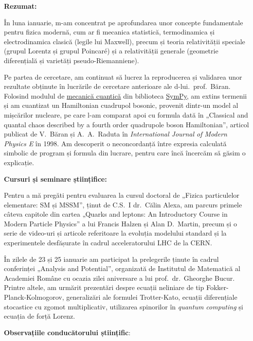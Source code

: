 
\makereportpreamble

\textbf{Rezumat:}

În luna ianuarie, m-am concentrat pe aprofundarea unor concepte fundamentale pentru fizica modernă, cum ar fi mecanica statistică, termodinamica și electrodinamica clasică (legile lui Maxwell), precum și teoria relativității speciale (grupul Lorentz și grupul Poincaré) și a relativității generale (geometrie diferențială și varietăți pseudo-Riemanniene).

Pe partea de cercetare, am continuat să lucrez la reproducerea și validarea unor rezultate obținute în lucrările de cercetare anterioare ale d-lui.~prof.~Băran. Folosind modulul de \href{https://docs.sympy.org/latest/modules/physics/quantum/index.html}{mecanică cuantică} din biblioteca \href{https://www.sympy.org/en/index.html}{SymPy}, am extins termenii și am cuantizat un Hamiltonian cuadrupol bosonic, provenit dintr-un model al mișcărilor nucleare, pe care l-am comparat apoi cu formula dată în „Classical and quantal chaos described by a fourth order quadrupole boson Hamiltonian”, articol publicat de V.~Băran și A.~A.~Raduta în \textit{International Journal of Modern Physics E} în 1998. Am descoperit o neconcordanță între expresia calculată simbolic de program și formula din lucrare, pentru care încă încercăm să găsim o explicație.

\vspace{0.5em}

\textbf{Cursuri și seminare științifice:}

Pentru a mă pregăti pentru evaluarea la cursul doctoral de „Fizica particulelor elementare: SM și MSSM”, ținut de C.S.~I dr.~Călin Alexa, am parcurs primele câteva capitole din cartea „Quarks and leptons: An Introductory Course in Modern Particle Physics” a lui Francis Halzen și Alan D.\ Martin, precum și o serie de video-uri și articole referitoare la evoluția modelului standard și la experimentele desfășurate în cadrul acceleratorului LHC de la CERN.

În zilele de 23 și 25 ianuarie am participat la prelegerile ținute în cadrul conferinței „Analysis and Potential”, organizată de Institutul de Matematică al Academiei Române cu ocazia zilei aniversare a lui prof.~dr.~Gheorghe Bucur. Printre altele, am urmărit prezentări despre ecuații neliniare de tip Fokker-Planck-Kolmogorov, generalizări ale formulei Trotter-Kato, ecuații diferențiale stocastice cu zgomot multiplicativ, utilizarea spinorilor în \emph{quantum computing} și ecuația de forță Lorenz.

\vspace{0.5em}

\textbf{Observațiile conducătorului științific}:

\vspace{2em}

